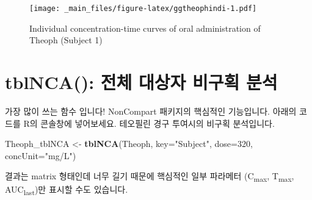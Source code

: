 \documentclass[12pt,]{krantz}
\newenvironment{Shaded}{\begin{snugshade}}{\end{snugshade}}
\newcommand{\KeywordTok}[1]{\textcolor[rgb]{0.13,0.29,0.53}{\textbf{#1}}}
\newcommand{\DataTypeTok}[1]{\textcolor[rgb]{0.13,0.29,0.53}{#1}}
\newcommand{\DecValTok}[1]{\textcolor[rgb]{0.00,0.00,0.81}{#1}}
\newcommand{\StringTok}[1]{\textcolor[rgb]{0.31,0.60,0.02}{#1}}
\newcommand{\OperatorTok}[1]{\textcolor[rgb]{0.81,0.36,0.00}{\textbf{#1}}}
\newcommand{\NormalTok}[1]{#1}
\begin{document}
\begin{Shaded}
\end{Shaded}

\begin{figure}
\centering
\texttt{[image: \_main\_files/figure-latex/ggtheophindi-1.pdf]}
\caption{\label{fig:ggtheophindi}Individual concentration-time curves of
oral administration of Theoph (Subject 1)}
\end{figure}

\section{tblNCA(): 전체 대상자 비구획 분석}\label{tblnca----}

가장 많이 쓰는 함수 입니다! NonCompart 패키지의 핵심적인 기능입니다.
아래의 코드를 R의 콘솔창에 넣어보세요. 테오필린 경구 투여시의 비구획
분석입니다.

\begin{Shaded}
\begin{Highlighting}[]
\NormalTok{Theoph_tblNCA <-}\StringTok{ }\KeywordTok{tblNCA}\NormalTok{(Theoph, }\DataTypeTok{key=}\StringTok{"Subject"}\NormalTok{, }\DataTypeTok{dose=}\DecValTok{320}\NormalTok{, }\DataTypeTok{concUnit=}\StringTok{"mg/L"}\NormalTok{)}
\end{Highlighting}
\end{Shaded}

결과는 matrix 형태인데 너무 길기 때문에 핵심적인 일부 파라메터
(C\textsubscript{max}, T\textsubscript{max}, AUC\textsubscript{last})만
표시할 수도 있습니다.
\end{document}
